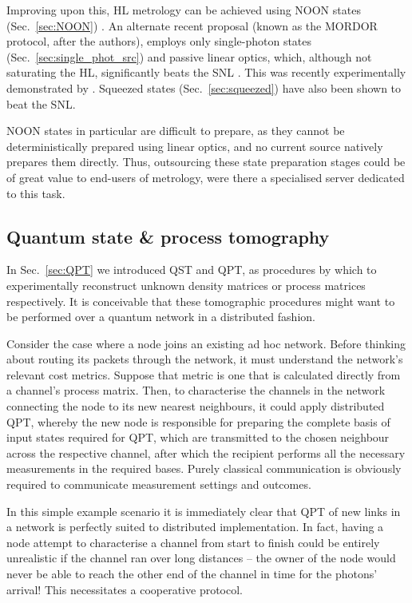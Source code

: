 Improving upon this, HL metrology can be achieved using NOON states (Sec.~\ref{sec:NOON}) \cite{bib:Dowling08}. An alternate recent proposal (known as the MORDOR protocol, after the authors), employs only single-photon states (Sec.~\ref{sec:single_phot_src}) and passive linear optics, which, although not saturating the HL, significantly beats the SNL \cite{bib:MORDOR15, bib:MORDOR2}. This was recently experimentally demonstrated by \cite{???}. Squeezed states (Sec.~\ref{sec:squeezed}) have also been shown to beat the SNL.

NOON states in particular are difficult to prepare, as they cannot be deterministically prepared using linear optics, and no current source natively prepares them directly. Thus, outsourcing these state preparation stages could be of great value to end-users of metrology, were there a specialised server dedicated to this task.

\cite{DomBerry}

%
%

\subsection{Quantum state \& process tomography}  

In Sec.~\ref{sec:QPT} we introduced QST and QPT, as procedures by which to experimentally reconstruct unknown density matrices or process matrices respectively. It is conceivable that these tomographic procedures might want to be performed over a quantum network in a distributed fashion.

Consider the case where a node joins an existing ad hoc network. Before thinking about routing its packets through the network, it must understand the network's relevant cost metrics. Suppose that metric is one that is calculated directly from a channel's process matrix. Then, to characterise the channels in the network connecting the node to its new nearest neighbours, it could apply distributed QPT, whereby the new node is responsible for preparing the complete basis of input states required for QPT, which are transmitted to the chosen neighbour across the respective channel, after which the recipient performs all the necessary measurements in the required bases. Purely classical communication is obviously required to communicate measurement settings and outcomes.

In this simple example scenario it is immediately clear that QPT of new links in a network is perfectly suited to distributed implementation. In fact, having a node attempt to characterise a channel from start to finish could be entirely unrealistic if the channel ran over long distances -- the owner of the node would never be able to reach the other end of the channel in time for the photons' arrival! This necessitates a cooperative protocol.

